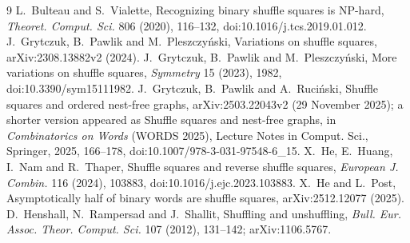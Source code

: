 \documentclass[12pt]{article}
\begin{document}
\begin{thebibliography}{9}
 L.~Bulteau and S.~Vialette, Recognizing binary shuffle squares is NP-hard,
\emph{Theoret. Comput. Sci.} 806 (2020), 116--132, doi:10.1016/j.tcs.2019.01.012.
 J.~Grytczuk, B.~Pawlik and M.~Pleszczy\'nski, Variations on shuffle squares,
arXiv:2308.13882v2 (2024).
 J.~Grytczuk, B.~Pawlik and M.~Pleszczy\'nski, More variations on shuffle squares,
\emph{Symmetry} 15 (2023), 1982, doi:10.3390/sym15111982.
 J.~Grytczuk, B.~Pawlik and A.~Ruci\'nski, Shuffle squares and ordered nest-free graphs,
arXiv:2503.22043v2 (29 November 2025); a shorter version appeared as Shuffle squares and nest-free graphs, in
\emph{Combinatorics on Words} (WORDS 2025), Lecture Notes in Comput. Sci., Springer, 2025, 166--178,
doi:10.1007/978-3-031-97548-6\_15.
 X.~He, E.~Huang, I.~Nam and R.~Thaper, Shuffle squares and reverse shuffle squares,
\emph{European J. Combin.} 116 (2024), 103883, doi:10.1016/j.ejc.2023.103883.
 X.~He and L.~Post, Asymptotically half of binary words are shuffle squares, arXiv:2512.12077
(2025).
 D.~Henshall, N.~Rampersad and J.~Shallit, Shuffling and unshuffling,
\emph{Bull. Eur. Assoc. Theor. Comput. Sci.} 107 (2012), 131--142; arXiv:1106.5767.
\end{thebibliography}
\end{document}
